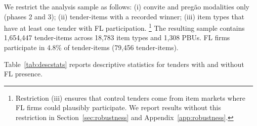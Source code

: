 We restrict the analysis sample as follows: (i) convite and preg\~ao
modalities only (phases 2 and 3); (ii) tender-items with a recorded
winner; (iii) item types that have at least one tender with FL
participation.%
\footnote{Restriction (iii) ensures that control tenders come from item
markets where FL firms could plausibly participate. We report results
without this restriction in Section~\ref{sec:robustness} and
Appendix~\ref{app:robustness}.}
The resulting sample contains 1,654,447 tender-items across 18,783
item types and 1,308 PBUs. FL firms participate in 4.8\% of
tender-items (79,456 tender-items).

Table~\ref{tab:descstats} reports descriptive statistics for tenders
with and without FL presence.


